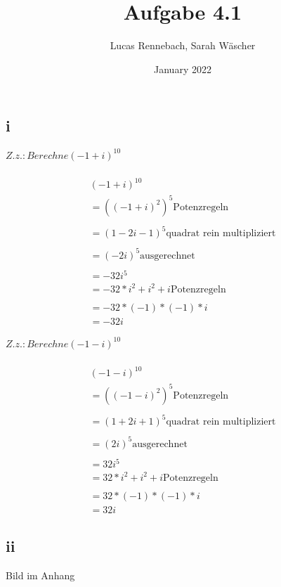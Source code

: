 \documentclass{scrartcl}
\title{Aufgabe 4.1}
\author{Lucas Rennebach, Sarah Wäscher}
\date{January 2022}
\begin{document}
	
 \maketitle
	
\section{}
\subsection*{i}

$ Z.z.: Berechne (-1 + i)^{10} $

\begin{align*}
	\\
	(-1 + i)^{10}
	\\
    = ((-1 + i)^2)^5 \text{Potenzregeln}\\
	\\
	=(1 -2i -1)^5 \text{quadrat rein multipliziert}\\
	\\
	=(-2i)^5 \text{ausgerechnet}\\
	\\
	= -32i^5
	\\
	= -32 * i^2 + i^2 +i \text{Potenzregeln}\\
	\\
	= -32 * (-1) * (-1) *i
	\\
	= -32i
\end{align*}


	
$	Z.z.: Berechne (-1 - i)^{10} $
	
	\begin{align*}
	\\
		(-1 - i)^{10}
		\\
		= ((-1 - i)^2)^5 \text{Potenzregeln}\\
		\\
		=(1 +2i +1)^5 \text{quadrat rein multipliziert}\\
		\\
		=(2i)^5 \text{ausgerechnet}\\
		\\
		= 32i^5
		\\
		= 32 * i^2 + i^2 +i \text{Potenzregeln}\\
		\\
		= 32 * (-1) *(-1) *i
		\\
		= 32i
	\end{align*}

	\subsection*{ii}
	Bild im Anhang
\end{document}
